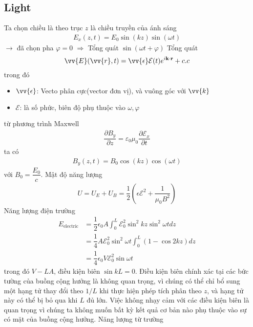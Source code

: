 \documentclass{report}
\newcommand{\f}[2]{\dfrac{#1}{#2}}
\begin{document}
\subsection{Light}
Ta chọn chiều là theo trục $z$ là chiều truyền của ánh sáng
\begin{gather}
	E_{x} (z, t) = E_{0} \sin (kz) \sin (\omega t)
\end{gather}
$\rightarrow$ đã chọn pha $\varphi = 0$ $\Rightarrow$ Tổng quát $\sin (\omega t + \varphi)$
Tổng quát
\begin{gather}
	\vv{E}(\vv{r},t) = \vv{\epsilon} \mathcal{E}(t) e^{i \mathbf{k \cdot r}} + c.c
\end{gather}
trong đó
\begin{itemize}
	\item $\vv{\epsilon}$: Vecto phân cực(vector đơn vị), và vuông góc với $\vv{k}$
	\item $\mathcal{E}$: là số phức, biên độ phụ thuộc vào $\omega , \varphi$
\end{itemize}
từ phương trình Maxwell
\begin{gather}
	\f{\partial B_{y}}{\partial z} = \varepsilon_{0} \mu_{0} \f{\partial \mathcal{E}_{x}}{\partial t}
\end{gather}
ta có
\begin{gather}
	B_{y}(z,t) = B_{0} \cos(k z) \cos (\omega t)
\end{gather}
với $B_{0} = \f{E_{0}}{c}$. Mật độ năng lượng
\begin{gather}
	U = U_{E} + U_{B} = \f{1}{2}  \left( \epsilon \mathcal{E}^{2} + \f{1}{\mu_{0}B^{2}} \right)
\end{gather}
Năng lượng điện trường
\begin{equation}
	\begin{aligned}
		E_{\text{electric}}
		&= \f{1}{2} \epsilon_{0} A \int_{0}^{L} \mathcal{E}_{0}^{2} \sin^{2} kz \sin^{2} \omega t dz\\
		&= \f{1}{4} A \mathcal{E}_{0}^{2} \sin^{2} \omega t \int_{0}^{L} (1 - \cos 2 kz)dz\\
		&= \f{1}{4} \epsilon_{0} V \mathcal{E}_{0}^{2} \sin \omega t
	\end{aligned}
\end{equation}
trong đó $V - LA$, điều kiện biên $\sin kL = 0$. Điều kiện biên chính xác tại các bức tường của buồng cộng hưởng là không quan trọng, vì chúng có thể chỉ bổ sung một hạng tử thay đổi theo $1/L$ khi thực hiện phép tích phân theo $z$, và hạng tử này có thể bị bỏ qua khi $L$ đủ lớn. Việc không nhạy cảm với các điều kiện biên là quan trọng vì chúng ta không muốn bất kỳ kết quả cơ bản nào phụ thuộc vào sự có mặt của buồng cộng hưởng. Năng lượng từ trường
\end{document}
